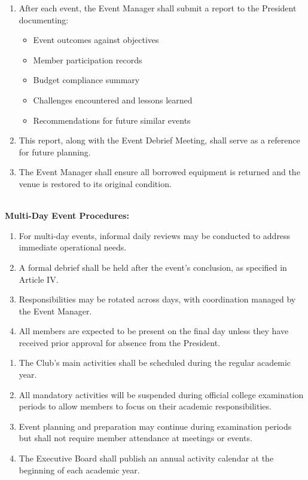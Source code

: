 \begin{enumerate}[label=\alph*), leftmargin=2em, itemsep=0.3em]
    \item After each event, the Event Manager shall submit a report to the President documenting:
    \begin{itemize}[leftmargin=1.5em, itemsep=0.2em]
        \item Event outcomes against objectives
        \item Member participation records
        \item Budget compliance summary
        \item Challenges encountered and lessons learned
        \item Recommendations for future similar events
    \end{itemize}
    \item This report, along with the Event Debrief Meeting, shall serve as a reference for future planning.
    \item The Event Manager shall ensure all borrowed equipment is returned and the venue is restored to its original condition.
\end{enumerate}
\\
\textbf{Multi-Day Event Procedures:}
\begin{enumerate}[label=\alph*), leftmargin=2em, itemsep=0.3em]
    \item For multi-day events, informal daily reviews may be conducted to address immediate operational needs.
    \item A formal debrief shall be held after the event's conclusion, as specified in Article IV.
    \item Responsibilities may be rotated across days, with coordination managed by the Event Manager.
    \item All members are expected to be present on the final day unless they have received prior approval for absence from the President.
\end{enumerate}


\begin{enumerate}[label=\alph*), leftmargin=2em, itemsep=0.3em]
    \item The Club's main activities shall be scheduled during the regular academic year.
    \item All mandatory activities will be suspended during official college examination periods to allow members to focus on their academic responsibilities.
    \item Event planning and preparation may continue during examination periods but shall not require member attendance at meetings or events.
    \item The Executive Board shall publish an annual activity calendar at the beginning of each academic year.
\end{enumerate}

